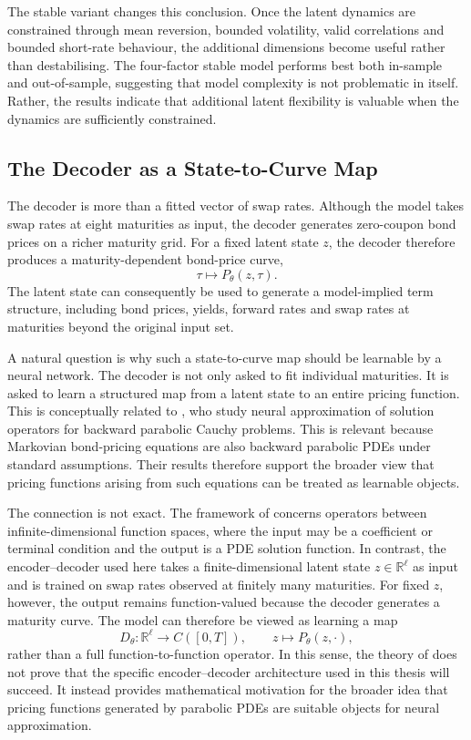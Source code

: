 The stable variant changes this conclusion. Once the latent dynamics are constrained through mean reversion, bounded volatility, valid correlations and bounded short-rate behaviour, the additional dimensions become useful rather than destabilising. The four-factor stable model performs best both in-sample and out-of-sample, suggesting that model complexity is not problematic in itself. Rather, the results indicate that additional latent flexibility is valuable when the dynamics are sufficiently constrained.


\subsection{The Decoder as a State-to-Curve Map}

The decoder is more than a fitted vector of swap rates. Although the model takes swap rates at eight maturities as input, the decoder generates zero-coupon bond prices on a richer maturity grid. For a fixed latent state \(z\), the decoder therefore produces a maturity-dependent bond-price curve,
\[
    \tau \mapsto P_\theta(z,\tau).
\]
The latent state can consequently be used to generate a model-implied term structure, including bond prices, yields, forward rates and swap rates at maturities beyond the original input set.

A natural question is why such a state-to-curve map should be learnable by a neural network. The decoder is not only asked to fit individual maturities. It is asked to learn a structured map from a latent state to an entire pricing function. This is conceptually related to \citet{Benth2024}, who study neural approximation of solution operators for backward parabolic Cauchy problems. This is relevant because Markovian bond-pricing equations are also backward parabolic PDEs under standard assumptions. Their results therefore support the broader view that pricing functions arising from such equations can be treated as learnable objects.

The connection is not exact. The framework of \citet{Benth2024} concerns operators between infinite-dimensional function spaces, where the input may be a coefficient or terminal condition and the output is a PDE solution function. In contrast, the encoder--decoder used here takes a finite-dimensional latent state \(z\in\mathbb{R}^{\ell}\) as input and is trained on swap rates observed at finitely many maturities. For fixed \(z\), however, the output remains function-valued because the decoder generates a maturity curve. The model can therefore be viewed as learning a map
\[
    D_\theta:\mathbb{R}^{\ell}\to C([0,T]),
    \qquad
    z\mapsto P_\theta(z,\cdot),
\]
rather than a full function-to-function operator. In this sense, the theory of \citet{Benth2024} does not prove that the specific encoder--decoder architecture used in this thesis will succeed. It instead provides mathematical motivation for the broader idea that pricing functions generated by parabolic PDEs are suitable objects for neural approximation.


